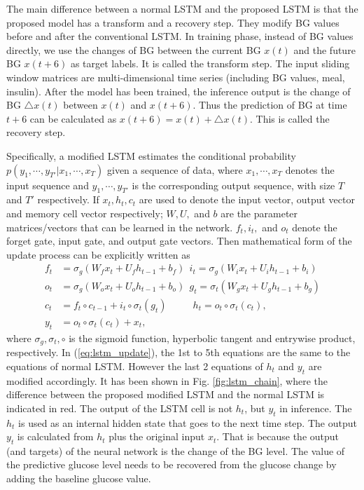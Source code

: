 \documentclass[a4paper, 10 pt, twocolumn]{IEEEtran}
\begin{document}
The main difference between a normal LSTM and the proposed LSTM is that the proposed model {has a transform and a recovery step. They modify BG values before and after the conventional LSTM. In training phase}, instead of
BG values directly, we use the changes of BG between the current BG $x(t)$ and the future BG $x(t+6)$ as target labels. It is called the transform step. The input sliding window matrices are multi-dimensional time series
(including BG values, meal, insulin). After the model has been trained, the inference output is the change of BG $\triangle x(t)$ between $x(t)$ and $x(t+6)$. Thus the prediction of BG at time $t+6$ can be calculated as
$x(t+6) = x(t) + \triangle x(t)$. This is called the recovery step. %

Specifically,  a modified LSTM estimates the conditional probability $p(y_1, \cdots,y_{T'}|x_1, \cdots,x_{T})$ given a sequence of data, where $x_1, \cdots,x_{T}$ denotes the input sequence and $y_1, \cdots,y_{T'}$ is the
corresponding output sequence, with size $T$ and $T'$ respectively. If $x_t, h_t, c_t$ are used to denote the input vector, output vector and memory cell vector respectively; $W, U,$ and $b$ are the parameter
matrices/vectors that can be learned in the network. $f_t, i_t,$ and $o_t$ denote the forget gate, input gate, and output gate vectors. Then mathematical form of the update process can be explicitly written as
\begin{equation}\label{eq:lstm_update}
\begin{split}
f_t &= \sigma_g(W_fx_t + U_fh_{t-1}+b_f) \ \ i_t = \sigma_g(W_ix_t + U_ih_{t-1}+ b_i)  \\
o_t &= \sigma_g(W_ox_t + U_oh_{t-1}+b_o)  \ \  g_t = \sigma_t(W_gx_t + U_gh_{t-1}+ b_g)  \\
c_t &= f_t \circ c_{t-1} + i_t \circ \sigma_t(g_t)  \ \ \ \ \ \ \ \ \ \ \ \  h_t = o_t \circ \sigma_t(c_t), \\
y_t &= o_t \circ \sigma_t(c_t) + x_t,
\end{split}
\end{equation}
where $\sigma_g, \sigma_t, \circ$ is the sigmoid function, hyperbolic tangent and entrywise product, respectively. In (\ref{eq:lstm_update}), the 1st to 5th equations are the same to the equations of normal LSTM. However
the last 2 equations of $h_t$ and $y_t$ are modified accordingly.
 It has been shown in Fig. \ref{fig:lstm_chain}, where the difference between the proposed modified LSTM and the normal LSTM is indicated in red. The output of the LSTM cell is not $h_t$, but $y_t$ in inference. The $h_t$
 is used as an internal hidden state that goes to the next time step. The output $y_t$ is calculated from $h_t$ plus the original input $x_t$. That is because the output (and targets) of the neural network is the change
 of the  {BG} level. The value of the predictive glucose level needs to be recovered from the glucose change by adding the baseline glucose value.
\end{document}
